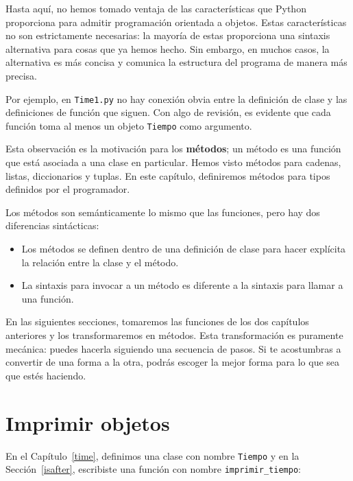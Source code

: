 \documentclass[10pt]{book}
\begin{document}
Hasta aquí, no hemos tomado ventaja de las características que Python proporciona para
admitir programación orientada a objetos.  Estas características
no son estrictamente necesarias: la mayoría de estas proporciona
una sintaxis alternativa para cosas que ya hemos hecho.  Sin embargo, en muchos casos,
la alternativa es más concisa y comunica la estructura del programa
de manera más precisa.

Por ejemplo, en {\tt Time1.py} no hay conexión
obvia entre la definición de clase y las definiciones de función
que siguen.  Con algo de revisión, es evidente que cada función
toma al menos un objeto {\tt Tiempo} como argumento.

Esta observación es la motivación para los {\bf métodos}; un método es
una función que está asociada a una clase en particular.
Hemos visto métodos para cadenas, listas, diccionarios y tuplas.
En este capítulo, definiremos métodos para tipos definidos por el programador.

Los métodos son semánticamente lo mismo que las funciones, pero hay
dos diferencias sintácticas:

\begin{itemize}

\item Los métodos se definen dentro de una definición de clase para
hacer explícita la relación entre la clase y el método.

\item La sintaxis para invocar a un método es diferente a la
sintaxis para llamar a una función.

\end{itemize}

En las siguientes secciones, tomaremos las funciones de los dos
capítulos anteriores y los transformaremos en métodos.  Esta transformación es
puramente mecánica: puedes hacerla siguiendo una secuencia de
pasos.  Si te acostumbras a convertir de una forma a la otra,
podrás escoger la mejor forma para lo que sea que estés haciendo.


\section{Imprimir objetos}

En el Capítulo~\ref{time}, definimos una clase con nombre
{\tt Tiempo} y en la Sección~\ref{isafter}, escribiste
una función con nombre \verb"imprimir_tiempo":
\end{document}
